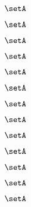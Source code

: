 \begin{forslides}
    \begin{equation}
        \label{eq:slides-translation-92}
        \setA
    \end{equation}

    \begin{equation}
        \label{eq:slides-translation-93}
        \setA
    \end{equation}

    \begin{equation}
        \label{eq:slides-translation-94}
        \setA
    \end{equation}

    \begin{equation}
        \label{eq:slides-translation-95}
        \setA
    \end{equation}

    \begin{equation}
        \label{eq:slides-translation-96}
        \setA
    \end{equation}

    \begin{equation}
        \label{eq:slides-translation-97}
        \setA
    \end{equation}

    \begin{equation}
        \label{eq:slides-translation-98}
        \setA
    \end{equation}

    \begin{equation}
        \label{eq:slides-translation-99}
        \setA
    \end{equation}

    \begin{equation}
        \label{eq:slides-translation-100}
        \setA
    \end{equation}

    \begin{equation}
        \label{eq:slides-translation-111}
        \setA
    \end{equation}

    \begin{equation}
        \label{eq:slides-translation-112}
        \setA
    \end{equation}

    \begin{equation}
        \label{eq:slides-translation-113}
        \setA
    \end{equation}

    \begin{equation}
        \label{eq:slides-translation-114}
        \setA
    \end{equation}


\end{forslides}
